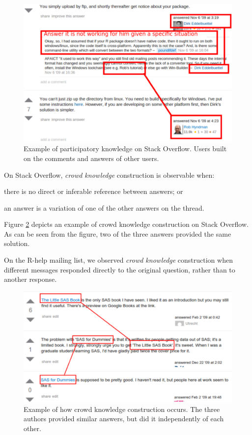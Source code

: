 \documentclass[smallextended]{svjour3}       %
\newcommand{\SO}{Stack Overflow\xspace}
\newcommand{\RH}{R-help\xspace}
\begin{document}
    \begin{figure}[!htb]
        \centering
        \includegraphics[width=\columnwidth]{../Figures/SO-PKimg5}
        \caption{Example of participatory knowledge on \SO. Users built on the comments and answers of other users.}
        \label{fig:SO-PK1}
            \end{figure}

On \SO, \textit{crowd knowledge} construction is observable when:
  \begin{enumerate*}[label=(\arabic*)]
    \item there is no direct or inferable reference between answers; or
    \item an answer is a variation of one of the other answers on the thread.
  \end{enumerate*}
Figure \ref{fig:CKC_MLSO} depicts an example of crowd knowledge construction on \SO. As can be seen from the figure, two of the three answers provided the same solution. 

On the \RH mailing list, we observed \textit{crowd knowledge} construction when different messages responded directly to the original question, rather than to another response.

    \begin{figure} [!htb]
        \centering
        \includegraphics[width=\columnwidth]{../Figures/SO-CSimg2}
        \caption{Example of how crowd knowledge construction occurs. The three authors provided similar answers, but did it independently of each other.}
        \label{fig:CKC_MLSO}
    \end{figure}
\end{document}

